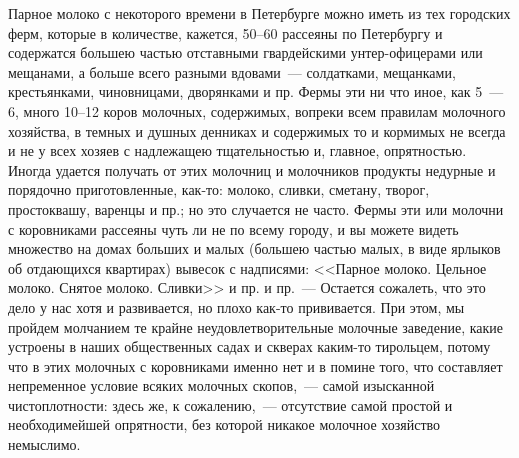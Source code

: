 Парное молоко с некоторого времени в Петербурге можно иметь из тех городских ферм, которые в количестве, кажется, 50–60 рассеяны по Петербургу и содержатся большею частью отставными гвардейскими унтер-офицерами или мещанами, а больше всего разными вдовами~--- солдатками, мещанками, крестьянками, чиновницами, дворянками и пр. Фермы эти ни что иное, как 5~--- 6, много 10–12 коров молочных, содержимых, вопреки всем правилам молочного хозяйства, в темных и душных денниках и содержимых то и кормимых не всегда и не у всех хозяев с надлежащею тщательностью и, главное, опрятностью. Иногда удается получать от этих молочниц и молочников продукты недурные и порядочно приготовленные, как-то: молоко, сливки, сметану, творог, простоквашу, варенцы и пр.; но это случается не часто. Фермы эти или молочни с коровниками рассеяны чуть ли не по всему городу, и вы можете видеть множество на домах больших и малых (большею частью малых, в виде ярлыков об отдающихся квартирах) вывесок с надписями: <<Парное молоко. Цельное молоко. Снятое молоко. Сливки>> и пр. и пр.~--- Остается сожалеть, что это дело у нас хотя и развивается, но плохо как-то прививается. При этом, мы пройдем молчанием те крайне неудовлетворительные молочные заведение, какие устроены в наших общественных садах и скверах каким-то тирольцем, потому что в этих молочных с коровниками именно нет и в помине того, что составляет непременное условие всяких молочных скопов,~--- самой изысканной чистоплотности: здесь же, к сожалению,~--- отсутствие самой простой и необходимейшей опрятности, без которой никакое молочное хозяйство немыслимо.

